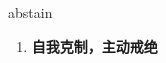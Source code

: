 
\begin{frame}
{\huge abstain}
\begin{center}
\begin{enumerate}\Large
  \item \textbf{自我克制，主动戒绝}
\end{enumerate}
\end{center}
\end{frame}
